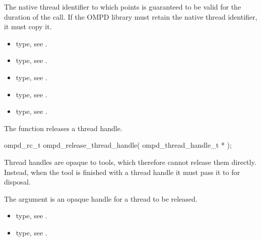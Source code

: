 The native thread identifier to which  points is guaranteed 
to be valid  for the duration of the call. If the OMPD library must retain 
the native thread identifier, it must copy it.

\crossreferences
\begin{itemize}
\item {} type, see .

\item {} type, see .

\item {} type, 
see .

\item {} type, 
see .

\item {} type, see .
\end{itemize}



\label{subsubsubsec:ompd_release_thread_handle}
\summary
The  function releases a thread handle.

\format
\begin{cspecific}
\begin{ompSyntax}
ompd_rc_t ompd_release_thread_handle(
  ompd_thread_handle_t *
);
\end{ompSyntax}
\end{cspecific}

\descr
Thread handles are opaque to tools, which therefore cannot release them 
directly. Instead, when the tool is finished with a thread handle it must 
pass it to  for disposal.

\argdesc
The  argument is an opaque handle for a thread to be released.

\crossreferences
\begin{itemize}
\item {} type, 
see .

\item {} type, see .
\end{itemize}



